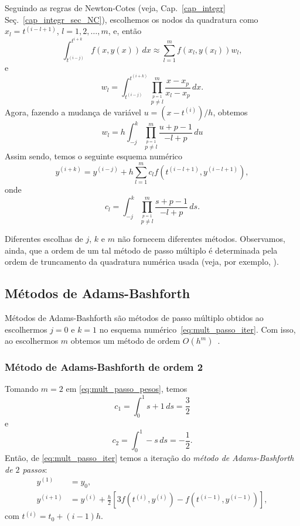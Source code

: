 Seguindo as regras de Newton-Cotes (veja, Cap.~\ref{cap_integr} Seç.~\ref{cap_integr_sec_NC}), escolhemos os nodos da quadratura como $x_l = t^{(i-l+1)}$, $l = 1, 2, \dotsc, m$, e, então
\begin{equation}
  \int_{t^{(i-j)}}^{t^{i+k}} f(x,y(x))\,dx \approx \sum_{l=1}^{m} f\left(x_l,y(x_l)\right)w_l,
\end{equation}
e
\begin{equation}
  w_l = \int_{t^{(i-j)}}^{t^{(i+k)}} \prod_{\overset{p=1}{p\neq l}}^m \frac{x-x_p}{x_l-x_p}\,dx.
\end{equation}
Agora, fazendo a mudança de variável $u=(x-t^{(i)})/h$, obtemos
\begin{equation}
  w_l = h\int_{-j}^{k} \prod_{\overset{p=1}{p\neq l}}^m \frac{u+p-1}{-l+p}\,du
\end{equation}
Assim sendo, temos o seguinte esquema numérico
\begin{equation}
  y^{(i+k)} = y^{(i-j)} + h\sum_{l=1}^m c_{l}f(t^{(i-l+1)},y^{(i-l+1)}),\label{eq:mult_passo_iter}
\end{equation}
onde
\begin{equation}
  c_l = \int_{-j}^{k} \prod_{\overset{p=1}{p\neq l}}^m \frac{s+p-1}{-l+p}\,ds.\label{eq:mult_passo_pesos}
\end{equation}

Diferentes escolhas de $j$, $k$ e $m$ não fornecem diferentes métodos. Observamos, ainda, que a ordem de um tal método de passo múltiplo é determinada pela ordem de truncamento da quadratura numérica usada (veja, por exemplo, \cite[Cap. 5, Seç. 5.6]{Burden2015a}).

\subsection{Métodos de Adams-Bashforth}

Métodos de Adams-Bashforth são métodos de passo múltiplo obtidos ao escolhermos $j=0$ e $k=1$ no esquema numérico~\eqref{eq:mult_passo_iter}. Com isso, ao escolhermos $m$ obtemos um método de ordem $O(h^{m})$~\cite[Cap. 5, Seç. 5.6]{Burden2015a}.

\subsubsection{Método de Adams-Bashforth de ordem 2}

Tomando $m=2$ em \eqref{eq:mult_passo_pesos}, temos
\begin{equation}
  c_1 = \int_0^1 s+1\,ds = \frac{3}{2}
\end{equation}
e
\begin{equation}
  c_2 = \int_0^1 -s\,ds = -\frac{1}{2}.
\end{equation}
Então, de \eqref{eq:mult_passo_iter} temos a iteração do \emph{método de Adams-Bashforth de $2$ passos}:
\begin{align}
  y^{(1)} &= y_0,\\
  y^{(i+1)} &= y^{(i)} + \frac{h}{2}\left[3f(t^{(i)},y^{(i)}) - f(t^{(i-1)},y^{(i-1)})\right],
\end{align}
com $t^{(i)} = t_0 + (i-1)h$.

